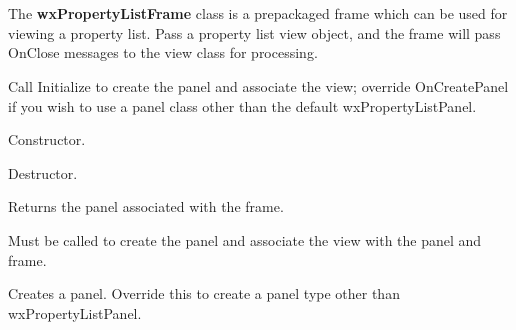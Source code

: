 \section{}\label{wxpropertylistframe}

The {\bf wxPropertyListFrame} class is a prepackaged frame which can
be used for viewing a property list. Pass a property list view object, and the frame
will pass OnClose messages to the view class for processing.

Call Initialize to create the panel and associate the view; override OnCreatePanel
if you wish to use a panel class other than the default wxPropertyListPanel.



Constructor.



Destructor.



Returns the panel associated with the frame.



Must be called to create the panel and associate the view with the panel and frame.



Creates a panel. Override this to create a panel type other than wxPropertyListPanel.


